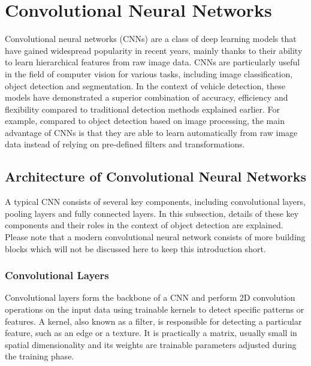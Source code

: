 
\section{Convolutional Neural Networks}
\label{CNNs}


Convolutional neural networks (CNNs) are a class of deep learning models that
have gained widespread popularity in recent years, mainly thanks to their
ability to learn hierarchical features from raw image data. CNNs are
particularly useful in the field of computer vision for various tasks, including
image classification, object detection and segmentation. In the context of
vehicle detection, these models have demonstrated a superior combination of
accuracy, efficiency and flexibility compared to traditional detection methods
explained earlier. For example, compared to object detection based on image
processing, the main advantage of CNNs is that they are able to learn
automatically from raw image data instead of relying on pre-defined filters and
transformations. \cite{Li2022}


\subsection{Architecture of Convolutional Neural Networks}

A typical CNN consists of several key components, including convolutional
layers, pooling layers and fully connected layers. In this subsection, details
of these key components and their roles in the context of object detection are
explained. Please note that a modern convolutional neural network consists of
more building blocks which will not be discussed here to keep this introduction
short.

\subsubsection{Convolutional Layers}

Convolutional layers form the backbone of a CNN and perform 2D convolution
operations on the input data using trainable kernels to detect specific patterns
or features. A kernel, also known as a filter, is responsible for detecting a
particular feature, such as an edge or a texture. It is practically a matrix,
usually small in spatial dimensionality and its weights are trainable parameters
adjusted during the training phase. \cite{OShea2015}

